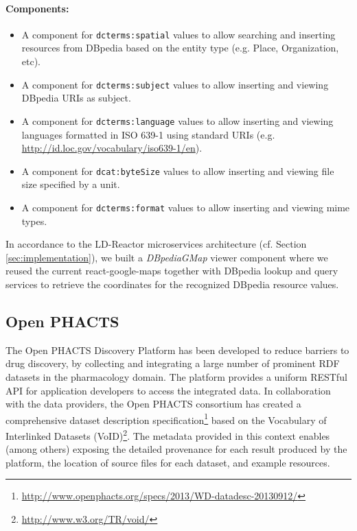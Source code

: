 \documentclass{llncs}
\begin{document}
\paragraph{Components:}
\small
\begin{itemize}
 \item A component for \texttt{dcterms:spatial} values to allow searching and inserting resources from DBpedia based on the entity type (e.g. Place, Organization, etc).
 \item A component for \texttt{dcterms:subject} values to allow inserting and viewing DBpedia URIs as subject.
 \item A component for \texttt{dcterms:language} values to allow inserting and viewing languages formatted in ISO 639-1 using standard URIs (e.g.  \url{http://id.loc.gov/vocabulary/iso639-1/en}).
 \item A component for \texttt{dcat:byteSize} values to allow inserting and viewing file size specified by a unit.
  \item A component for \texttt{dcterms:format} values to allow inserting and viewing mime types.
\end{itemize}

In accordance to the LD-Reactor microservices architecture (cf. Section \ref{sec:implementation}), we built a \emph{DBpediaGMap} viewer component where we reused the current react-google-maps together with DBpedia lookup and query services to retrieve the coordinates for the recognized DBpedia resource values.
\vspace{-1em}
\subsection{Open PHACTS}

The Open PHACTS Discovery Platform has been developed to reduce barriers to drug discovery, by collecting and integrating a large number of prominent RDF datasets in the pharmacology domain. The platform provides a uniform RESTful API for application developers to access the integrated data.
In collaboration with the data providers, the Open PHACTS consortium has created a comprehensive dataset description specification\footnote{\url{http://www.openphacts.org/specs/2013/WD-datadesc-20130912/}} based on the Vocabulary of Interlinked Datasets (VoID)\footnote{\url{http://www.w3.org/TR/void/}}. The metadata provided in this context enables (among others) exposing the detailed provenance for each result produced by the platform, the location of source files for each dataset, and example resources.
\end{document}
